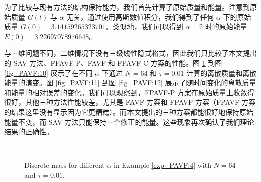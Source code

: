 	为了比较与现有方法的结构保持能力，我们首先计算了原始质量和能量。注意到原始质量 $G(t)$ 与 $\alpha$ 无关，通过使用高斯数值积分，我们得到了任何 $\alpha$ 下的原始质量 $G(0)=3.14159265323701$。类似地，我们可以得到 $\alpha=2$ 时的原始能量 $E(0)=3.22697078976648$。

与一维问题不同，二维情况下没有三级线性隐式格式，因此我们只比较了本文提出的 SAV 方法、FPAVF-P、FAVF 和 FPAVF-C 方案的性能。图 \ref{fig_PAVF:9} 到图 \ref{fig_PAVF:10} 展示了在不同 $\alpha$ 下通过 $N=64$ 和 $\tau=0.01$ 计算的离散质量和离散能量的演变。图 \ref{fig_PAVF:11} 到图 \ref{fig_PAVF:12} 展示了随时间变化的离散质量和能量的相对误差的变化。我们可以观察到，FPAVF-P 方案在原始质量上收敛得很好，其他三种方法性能较差，尤其是 FAVF 方案和 FPAVF 方案（FPAVF 方案的结果这里没有显示因为它更糟糕）。而本文提出的三种方案都能很好地保持原始能量不变，而 SAV 方法只能保持一个修正的能量。这些现象再次确认了我们理论结果的正确性。


\begin{figure}[H]
	\begin{center}
	 \\
	 \caption{Discrete mass for different $\alpha$ in Example \ref{exp_PAVF:4} with $N = 64$ and $\tau=0.01$.} \label{fig_PAVF:9}
	\end{center}
	\end{figure}

